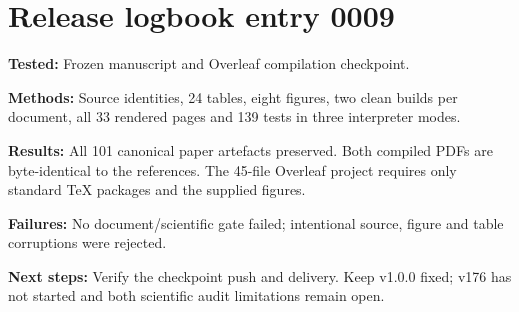 \section*{Release logbook entry 0009}
\textbf{Tested:} Frozen manuscript and Overleaf compilation checkpoint.

\textbf{Methods:} Source identities, 24 tables, eight figures, two clean builds per document, all 33 rendered pages and 139 tests in three interpreter modes.

\textbf{Results:} All 101 canonical paper artefacts preserved. Both compiled PDFs are byte-identical to the references. The 45-file Overleaf project requires only standard TeX packages and the supplied figures.

\textbf{Failures:} No document/scientific gate failed; intentional source, figure and table corruptions were rejected.

\textbf{Next steps:} Verify the checkpoint push and delivery. Keep v1.0.0 fixed; v176 has not started and both scientific audit limitations remain open.
